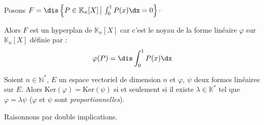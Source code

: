 \documentclass[a4paper,10pt]{report}
\begin{document}
\begin{preuve}
\vspace{10cm}
\end{preuve}

\begin{ex} Posons $F = \dis \left\lbrace P \in \mathbb{K}_n[X] \, \big{\vert} \, \int_{0}^1 P(x) \dx =0\right\rbrace \cdot$

\noindent Alors $F$ est un hyperplan de $\mathbb{K}_n[X]$ car c'est le noyau de la forme linéaire $\varphi$ sur $\mathbb{K}_n[X]$ définie par :
$$\varphi(P) = \dis \int_{0}^1 P(x) \dx$$
\end{ex}

\begin{prop} Soient $n \in \mathbb{N}^*$, $E$ un espace vectoriel de dimension $n$ et $\varphi$, $\psi$ deux formes linéaires sur $E$. Alors $\textrm{Ker}(\varphi) = \textrm{Ker}(\psi)$ si et seulement si il existe $\lambda \in \mathbb{K}^*$ tel que $\varphi = \lambda \psi$ ($\varphi$ et $\psi$ sont \textit{proportionnelles}).
\end{prop}

\begin{preuve} Raisonnons par double implications.

\vspace{11cm}
%
%
\end{preuve}
\end{document}
